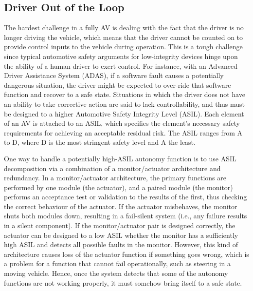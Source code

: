 \documentclass[a4paper, 10pt]{article}
\begin{document}
\subsection{Driver Out of the Loop}
\label{ssec:driver}
The hardest challenge in a fully AV is dealing with the fact that the driver is no longer driving the vehicle, which means that the driver cannot be counted on to provide control inputs to the vehicle during operation. This is a tough challenge since typical automotive safety arguments for low-integrity devices hinge upon the ability of a human driver to exert control. For instance, with an Advanced Driver Assistance System (ADAS), if a software fault causes a potentially dangerous situation, the driver might be expected to over-ride that software function and recover to a safe state. Situations in which the driver does not have an ability to take corrective action are said to lack controllability, and thus must be designed to a higher Automotive Safety Integrity Level (ASIL). Each element of an AV is attached to an ASIL, which specifies the element's necessary safety requirements for achieving an acceptable residual risk. The ASIL ranges from A to D, where D is the most stringent safety level and A the least.

One way to handle a potentially high-ASIL autonomy function is to use ASIL decomposition via a combination of a monitor/actuator architecture and redundancy. In a monitor/actuator architecture, the primary functions are performed by one module (the actuator), and a paired module (the monitor) performs an acceptance test or validation to the results of the first, thus checking the correct behaviour of the actuator. If the actuator misbehaves, the monitor shuts both modules down, resulting in a fail-silent system (i.e., any failure results in a silent component). If the monitor/actuator pair is designed correctly, the actuator can be designed to a low ASIL whether the monitor has a sufficiently high ASIL and detects all possible faults in the monitor. However, this kind of architecture causes loss of the actuator function if something goes wrong, which is a problem for a function that cannot fail operationally, such as steering in a moving vehicle. Hence, once the system detects that some of the autonomy functions are not working properly, it must somehow bring itself to a safe state.
\end{document}

